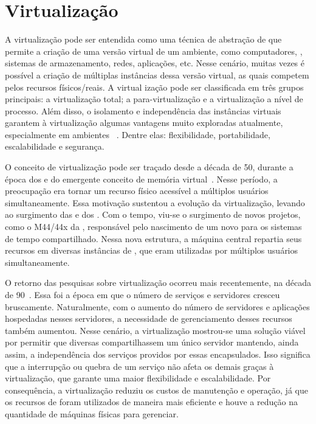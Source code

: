 \section{Virtualização}
\label{sec.virtualizacao}
A virtualização pode ser entendida como uma técnica de abstração de \hardware que permite a criação de uma versão virtual de um ambiente, como computadores, \sos, sistemas de armazenamento, redes, aplicações, etc. Nesse cenário, muitas vezes é possível a criação de múltiplas instâncias dessa versão virtual, as quais competem pelos recursos físicos/reais. A virtual ização pode ser classificada em três grupos principais: a virtualização total; a para-virtualização e a virtualização a nível de processo. Além disso, o isolamento e independência das instâncias virtuais garantem à virtualização algumas vantagens muito exploradas atualmente, especialmente em ambientes \cloud~\cite{manohar2013survey}. Dentre elas: flexibilidade, portabilidade, escalabilidade e segurança.

O conceito de virtualização pode ser traçado desde a década de 50, durante a época dos \mainframes e do emergente conceito de memória virtual~\cite{campbell2006introduction}. Nesse período, a preocupação era tornar um recurso físico acessível a múltiplos usuários simultaneamente. Essa motivação sustentou a evolução da virtualização, levando ao surgimento das \vms e dos \hypervisors. Com o tempo, viu-se o surgimento de novos projetos, como o M44/44x da \ibm, responsável pelo nascimento de um novo \design para os sistemas de tempo compartilhado. Nessa nova estrutura, a máquina central repartia seus recursos em diversas instâncias de \vms, que eram utilizadas por múltiplos usuários simultaneamente.

O retorno das pesquisas sobre virtualização ocorreu mais recentemente, na década de 90~\cite{campbell2006introduction}. Essa foi a época em que o número de serviços e servidores cresceu bruscamente. Naturalmente, com o aumento do número de servidores e aplicações hospedadas nesses servidores, a necessidade de gerenciamento desses recursos também aumentou. Nesse cenário, a virtualização mostrou-se uma solução viável por permitir que diversas \vms compartilhassem um único servidor mantendo, ainda assim, a independência dos serviços providos por essas \vms encapsulados. Isso significa que a interrupção ou quebra de um serviço não afeta os demais graças à virtualização, que garante uma maior flexibilidade e escalabilidade. Por consequência, a virtualização reduziu os custos de manutenção e operação, já que os recursos de \hardware foram utilizados de maneira mais eficiente e houve a redução na quantidade de máquinas físicas para gerenciar.

